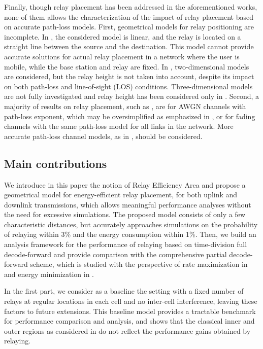 \documentclass[journal]{IEEEtran}
\theoremstyle{definition}
\begin{document}
Finally, though relay placement has been addressed in the aforementioned works, none of them allows the characterization of the impact of relay placement based on accurate path-loss models. 
First, geometrical models for relay positioning are incomplete. In \cite{yang2010,lin2007},
the considered model is linear, and the relay is located on a straight line between the source and the destination. This model cannot provide accurate solutions for actual relay placement in a network where the user is mobile, while the base station and relay are fixed. In \cite{lichun2008, huang2010, lu2011, yang2011, lin2010, joshi2011, youssef2012, khakurel2012}, two-dimensional models are considered, but the relay height is not taken into account, despite its impact on both path-loss and line-of-sight (LOS) conditions. Three-dimensional models are not fully investigated and relay height has been considered only in \cite{sambale2012}.
Second, a majority of results on relay placement, such as \cite{lin2010, joshi2011, youssef2012, khakurel2012, yang2011,yang2010,lin2007, lu2011}, are for AWGN channels with path-loss exponent, which may be oversimplified as emphasized in \cite{wang2010}, or for fading channels with the same path-loss model for all links in the network.
More accurate path-loss channel models, as in \cite{lichun2008, huang2010, sambale2012}, should be considered.



\subsection{Main contributions}

We introduce in this paper the notion of Relay Efficiency Area and propose a geometrical model for energy-efficient relay placement, for both uplink and downlink transmissions, which allows meaningful performance analyses without the need for excessive simulations.
The proposed model consists of only a few characteristic distances, but accurately approaches simulations on the probability of relaying within 3\% and the energy consumption within 1\%. Then, we build an analysis framework for the performance of relaying based on time-division full decode-forward and provide comparison with the comprehensive partial decode-forward scheme, which is studied with the perspective of rate maximization in \cite{Host-Madsen} and energy minimization in \cite{Journal1}.

In the first part, we consider as a baseline the setting with a fixed number of relays at regular locations  in each cell and no inter-cell interference, leaving these factors to future extensions. This baseline model provides a tractable benchmark for performance comparison and analysis, and shows that the classical inner and outer regions as considered in \cite{Chandwani2010} do not reflect the performance gains obtained by relaying.
\end{document}
